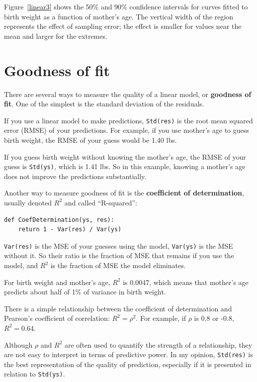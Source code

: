 \documentclass[12pt]{book}
\theoremstyle{exercise}
\begin{document}
Figure~\ref{linear3} shows the 50\% and 90\% confidence
intervals for curves fitted to birth weight as a function of
mother's age.
  The vertical width of the region represents the effect of
sampling error; the effect is smaller for values near the mean and
larger for the extremes.


\section{Goodness of fit}%
\label{goodness}%

There are several ways to measure the quality of a linear model, or
{\bf goodness of fit}.  One of the simplest is the standard deviation
of the residuals.%
%

If you use a linear model to make predictions, {\tt Std(res)}
is the root mean squared error (RMSE) of your predictions.  For
example, if you use mother's age to guess birth weight, the RMSE of
your guess would be 1.40 lbs.%
%

If you guess birth weight without knowing the mother's age, the RMSE
of your guess is {\tt Std(ys)}, which is 1.41 lbs.  So in this
example, knowing a mother's age does not improve the predictions
substantially.%

Another way to measure goodness of fit is  the {\bf
  coefficient of determination}, usually denoted $R^2$ and
called ``R-squared'':%
%

\begin{verbatim}
def CoefDetermination(ys, res):
    return 1 - Var(res) / Var(ys)
\end{verbatim}

{\tt Var(res)} is the MSE of your guesses using the model,
{\tt Var(ys)} is the MSE without it.   So their ratio is the fraction
of MSE that remains if you use the model, and $R^2$ is the fraction
of MSE the model eliminates.%

For birth weight and mother's age, $R^2$ is 0.0047, which means
that mother's age predicts about half of 1\% of variance in
birth weight.

There is a simple relationship between the coefficient of
determination and Pearson's coefficient of correlation: $R^2 = \rho^2$.
For example, if $\rho$ is 0.8 or -0.8, $R^2 = 0.64$.%

Although $\rho$ and $R^2$ are often used to quantify the strength of a
relationship, they are not easy to interpret in terms of predictive
power.  In my opinion, {\tt Std(res)} is the best representation
of the quality of prediction, especially if it is presented
in relation to {\tt Std(ys)}.%
%
\end{document}
